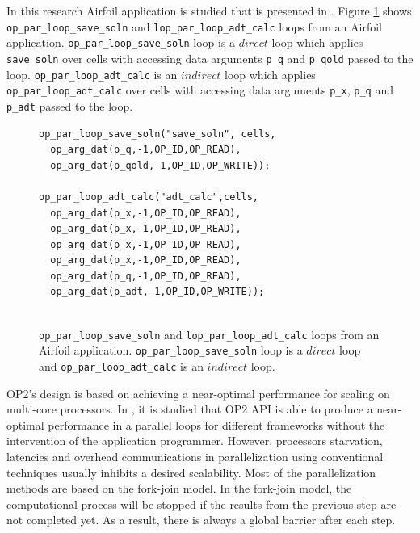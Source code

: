 \documentclass[conference]{IEEEtran}
\begin{document}
In this research Airfoil application is studied that is presented in \cite{o8}. Figure \ref{o1} shows \texttt{op\_par\_loop\_save\_soln} and \texttt{lop\_par\_loop\_adt\_calc} loops from an Airfoil application. \texttt{op\_par\_loop\_save\_soln} loop is a $direct$ loop which applies \texttt{save\_soln} over cells with accessing data arguments \texttt{p\_q} and \texttt{p\_qold} passed to the loop. \texttt{op\_par\_loop\_adt\_calc} is an $indirect$ loop which applies \texttt{op\_par\_loop\_adt\_calc} over cells with accessing data arguments \texttt{p\_x}, \texttt{p\_q} and \texttt{p\_adt} passed to the loop. 

\begin{figure} [!h]
    \begin{lstlisting}
op_par_loop_save_soln("save_soln", cells,
  op_arg_dat(p_q,-1,OP_ID,OP_READ),
  op_arg_dat(p_qold,-1,OP_ID,OP_WRITE));
  
op_par_loop_adt_calc("adt_calc",cells,
  op_arg_dat(p_x,-1,OP_ID,OP_READ),
  op_arg_dat(p_x,-1,OP_ID,OP_READ),
  op_arg_dat(p_x,-1,OP_ID,OP_READ),
  op_arg_dat(p_x,-1,OP_ID,OP_READ),
  op_arg_dat(p_q,-1,OP_ID,OP_READ),
  op_arg_dat(p_adt,-1,OP_ID,OP_WRITE));
  
    \end{lstlisting}
    \caption{\small{\texttt{op\_par\_loop\_save\_soln} and \texttt{lop\_par\_loop\_adt\_calc} loops from an Airfoil application.  \texttt{op\_par\_loop\_save\_soln} loop is a $direct$ loop and \texttt{op\_par\_loop\_adt\_calc} is an $indirect$ loop.}}
    \label{o1}
\end{figure}



OP2's design is based on achieving a near-optimal performance for scaling on multi-core processors. In \cite{o3,o4}, it is studied that OP2 API is able to produce a near-optimal performance in a parallel loops for different frameworks without the intervention of the application programmer. However, processors starvation, latencies and overhead communications in parallelization using conventional techniques usually inhibits a desired scalability. Most of the parallelization methods are based on the fork-join model. In the fork-join model, the computational process will be stopped if the results from the previous step are not completed yet. As a result, there is always a global barrier after each step. 
\end{document}
